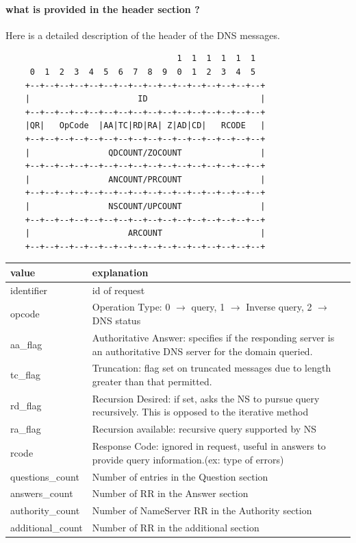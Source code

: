 \paragraph{what is provided in the header section ?}
Here is a detailed description of the header of the DNS messages. 
\begin{verbatim}
	                               1  1  1  1  1  1
	 0  1  2  3  4  5  6  7  8  9  0  1  2  3  4  5
	+--+--+--+--+--+--+--+--+--+--+--+--+--+--+--+--+
	|                      ID                       |
	+--+--+--+--+--+--+--+--+--+--+--+--+--+--+--+--+
	|QR|   OpCode  |AA|TC|RD|RA| Z|AD|CD|   RCODE   |
	+--+--+--+--+--+--+--+--+--+--+--+--+--+--+--+--+
	|                QDCOUNT/ZOCOUNT                |
	+--+--+--+--+--+--+--+--+--+--+--+--+--+--+--+--+
	|                ANCOUNT/PRCOUNT                |
	+--+--+--+--+--+--+--+--+--+--+--+--+--+--+--+--+
	|                NSCOUNT/UPCOUNT                |
	+--+--+--+--+--+--+--+--+--+--+--+--+--+--+--+--+
	|                    ARCOUNT                    |
	+--+--+--+--+--+--+--+--+--+--+--+--+--+--+--+--+

\end{verbatim}
\begin{tabular}{l|p{10cm}}
value & explanation \\
\hline
identifier & id of request\\
\hline
opcode & Operation Type: 0 $\rightarrow$ query, 1 $\rightarrow$ Inverse query, 2 $\rightarrow$ DNS status\\
\hline
aa\_flag & Authoritative Answer: specifies if the responding server is an authoritative DNS server for the domain queried. \\
\hline
tc\_flag & Truncation: flag set on truncated messages due to length greater than that permitted.\\
\hline
rd\_flag & Recursion Desired: if set, asks the NS to pursue query recursively. This is opposed to the iterative method\\
\hline
ra\_flag & Recursion available: recursive query supported by NS\\
\hline
rcode  & Response Code: ignored in request, useful in answers to provide query information.(ex: type of errors)\\
\hline
questions\_count  & Number of entries in the Question section\\
\hline
answers\_count  & Number of RR in the Answer section\\
\hline
authority\_count  & Number of NameServer RR in the Authority section\\
\hline
additional\_count  & Number of RR in the additional section\\
\hline
\end{tabular}

